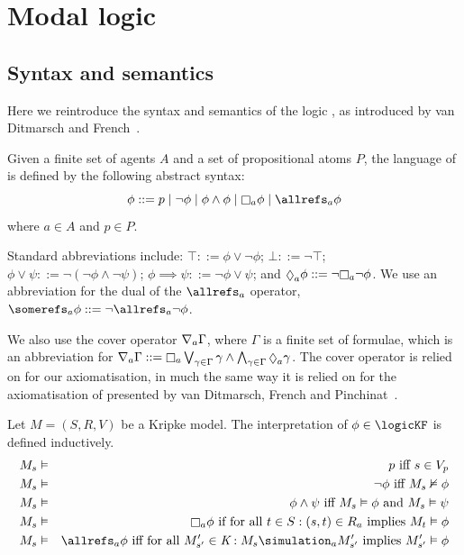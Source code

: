 \chapter{Modal logic}

\section{Syntax and semantics}

Here we reintroduce the syntax and semantics of the logic \logicKF{}, as
introduced by van Ditmarsch and French~\cite{french2009simulation}.


\begin{definition} %
Given a finite set of agents $A$ and a set of propositional atoms $P$, the
language of \langF{} is defined by the following abstract syntax:
$$
\phi ::=    p \bnfalt
            \neg \phi \bnfalt
            \phi \land \phi \bnfalt
            \knows_a \phi \bnfalt
            \allrefs_a \phi
$$
where $a \in A$ and $p \in P$.
\end{definition}

Standard abbreviations include:
$\top ::= \phi \lor \neg \phi$;
$\bot ::= \neg \top$;
$\phi \lor \psi ::= \neg (\neg \phi \land \neg \psi)$;
$\phi \implies \psi ::= \neg \phi \lor \psi$;
and $\suspects_a \phi ::= \neg \knows_a \neg \phi$.
We use an abbreviation for the dual of the $\allrefs_a$ operator,
$\somerefs_a \phi ::= \neg \allrefs_a \neg \phi$.

We also use the cover operator $\nabla_a \Gamma$, where $\Gamma$ is a finite
set of formulae, which is an abbreviation for 
$\covers_a \Gamma ::= \knows_a \bigvee_{\gamma \in \Gamma} \gamma \land
\bigwedge_{\gamma \in \Gamma} \suspects_a \gamma$. The cover operator is relied
on for our axiomatisation, in much the same way it is relied on for the
axiomatisation of \logicKiF{} presented by van Ditmarsch, French and
Pinchinat~\cite{french2010future}. %

\begin{definition}
Let $M = (S, R, V)$ be a Kripke model. The interpretation of $\phi \in
\logicKF$ is defined inductively.
\begin{eqnarray*}
M_s &\entails& p \text{ iff } s \in V_p\\
M_s &\entails& \neg \phi \text{ iff } M_s \nentails \phi\\
M_s &\entails& \phi \land \psi \text{ iff } M_s \entails \phi \text{ and } M_s
\entails \psi\\
M_s &\entails& \knows_a \phi \text{ if for all } t \in S : (s, t) \in R_a \text{
implies } M_t \entails \phi\\
M_s &\entails& \allrefs_a \phi \text{ iff for all } M'_{s'} \in \classK : M_s
\simulation_a M'_{s'} \text{ implies } M'_{s'} \entails \phi\\
\end{eqnarray*}
\end{definition}

